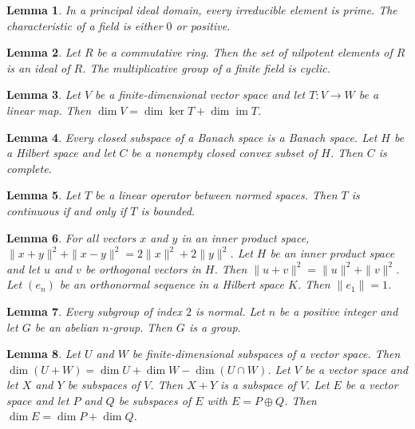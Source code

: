 \documentclass{article}
\newtheorem{lemma}{Lemma}
\begin{document}
\begin{lemma}\label{in-a}
In a principal ideal domain, every irreducible element is prime. The characteristic of a field is either $0$ or positive.
\end{lemma}

\begin{lemma}\label{set-subject}
Let $R$ be a commutative ring. Then the set of nilpotent elements of $R$ is an ideal of $R$. The multiplicative group of a finite field is cyclic.
\end{lemma}

\begin{lemma}\label{rank-nullity}
Let $V$ be a finite-dimensional vector space and let $T\colon V\to W$ be a linear map. Then $\dim V=\dim\ker T+\dim\operatorname{im}T$.
\end{lemma}

\begin{lemma}\label{normed-classical}
Every closed subspace of a Banach space is a Banach space. Let $H$ be a Hilbert space and let $C$ be a nonempty closed convex subset of $H$. Then $C$ is complete.
\end{lemma}

\begin{lemma}\label{operators-between}
Let $T$ be a linear operator between normed spaces. Then $T$ is continuous if and only if $T$ is bounded.
\end{lemma}

\begin{lemma}\label{orthogonal-vectors}
For all vectors $x$ and $y$ in an inner product space, $\|x+y\|^2+\|x-y\|^2=2\|x\|^2+2\|y\|^2$. Let $H$ be an inner product space and let $u$ and $v$ be orthogonal vectors in $H$. Then $\|u+v\|^2=\|u\|^2+\|v\|^2$. Let $(e_n)$ be an orthonormal sequence in a Hilbert space $K$. Then $\|e_1\|=1$.
\end{lemma}

\begin{lemma}\label{index-two}
Every subgroup of index $2$ is normal. Let $n$ be a positive integer and let $G$ be an abelian $n$-group. Then $G$ is a group.
\end{lemma}

\begin{lemma}\label{subspace-sums}
Let $U$ and $W$ be finite-dimensional subspaces of a vector space. Then $\dim(U+W)=\dim U+\dim W-\dim(U\cap W)$. Let $V$ be a vector space and let $X$ and $Y$ be subspaces of $V$. Then $X+Y$ is a subspace of $V$. Let $E$ be a vector space and let $P$ and $Q$ be subspaces of $E$ with $E=P\oplus Q$. Then $\dim E=\dim P+\dim Q$.
\end{lemma}
\end{document}
